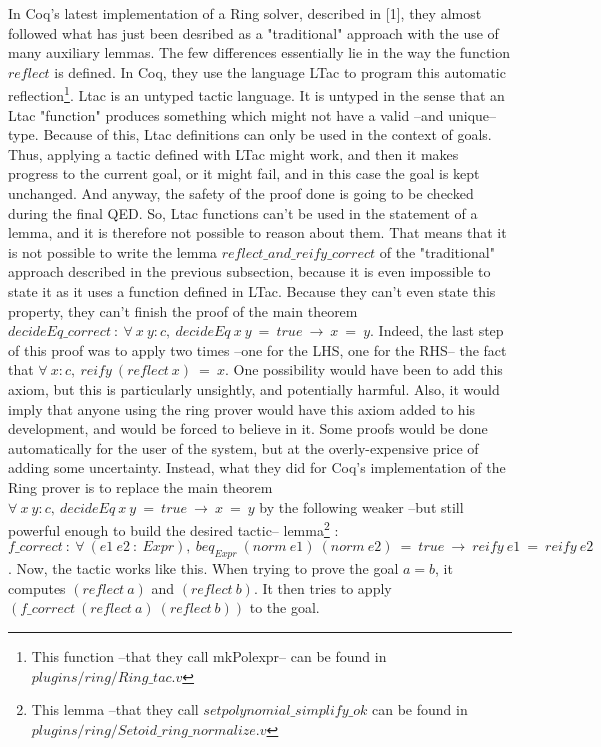 In Coq's latest implementation of a Ring solver, described in [1], they almost followed what has just been desribed as a "traditional" approach with the use of many auxiliary lemmas. The few differences essentially lie in the way the function $reflect$ is defined. In Coq, they use the language LTac to program this automatic reflection\footnote{This function --that they call mkPolexpr-- can be found in $plugins/ring/Ring\_tac.v$}. Ltac is an untyped tactic language. It is untyped in the sense that an Ltac "function" produces something which might not have a valid  --and unique-- type. Because of this, Ltac definitions can only be used in the context of goals. Thus, applying a tactic defined with LTac might work, and then it makes progress to the current goal, or it might fail, and in this case the goal is kept unchanged. And anyway, the safety of the proof done is going to be checked during the final QED. So, Ltac functions can't be used in the statement of a lemma, and it is therefore not possible to reason about them. That means that it is not possible to write the lemma $reflect\_and\_reify\_correct$ of the "traditional" approach described in the previous subsection, because it is even impossible to state it as it uses a function defined in LTac. Because they can't even state this property, they can't finish the proof of the main theorem $decideEq\_correct\ :\ \forall\  x\ y:c,\ decideEq\ x\ y\ =\ true\ \rightarrow\ x\ =\ y$. Indeed, the last step of this proof was to apply two times --one for the LHS, one for the RHS-- the fact that $\forall\ x:c,\ reify\ (reflect\ x)\ =\ x$. One possibility would have been to add this axiom, but this is particularly unsightly, and potentially harmful. Also, it would imply that anyone using the ring prover would have this axiom added to his development, and would be forced to believe in it. Some proofs would be done automatically for the user of the system, but at the overly-expensive price of adding some uncertainty.
Instead, what they did for Coq's implementation of the Ring prover is to replace the main theorem $\forall\  x\ y:c,\ decideEq\ x\ y\ =\ true\ \rightarrow\ x\ =\ y$ by the following weaker --but still powerful enough to build the desired tactic-- lemma\footnote{This lemma --that they call $setpolynomial\_simplify\_ok$ can be found in $plugins/ring/Setoid\_ring\_normalize.v$}  : $f\_correct\ :\ \forall\ (e1\ e2\ :\ Expr),\ beq_{Expr}\ (norm\ e1)\ (norm\ e2)\ =\ true\ \rightarrow\ reify\ e1\ =\ reify\ e2$.
Now, the tactic works like this. When trying to prove the goal $a=b$, it computes $(reflect\ a)$ and $(reflect\ b)$. It then tries to apply $(f\_correct\ (reflect\ a)\ (reflect\ b))$ to the goal. 
